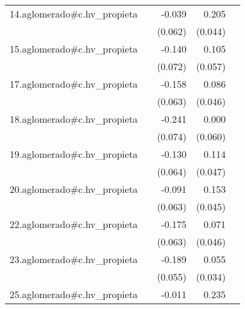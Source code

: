 {\begin{longtable}{l*{4}{D{.}{.}{-1}}}
\addlinespace
14.aglomerado#c.hv\_propieta&                     &      -0.039         &       0.205\sym{***}&                     \\
            &                     &     (0.062)         &     (0.044)         &                     \\
\addlinespace
15.aglomerado#c.hv\_propieta&                     &      -0.140         &       0.105         &                     \\
            &                     &     (0.072)         &     (0.057)         &                     \\
\addlinespace
17.aglomerado#c.hv\_propieta&                     &      -0.158\sym{*}  &       0.086         &                     \\
            &                     &     (0.063)         &     (0.046)         &                     \\
\addlinespace
18.aglomerado#c.hv\_propieta&                     &      -0.241\sym{**} &       0.000         &                     \\
            &                     &     (0.074)         &     (0.060)         &                     \\
\addlinespace
19.aglomerado#c.hv\_propieta&                     &      -0.130\sym{*}  &       0.114\sym{*}  &                     \\
            &                     &     (0.064)         &     (0.047)         &                     \\
\addlinespace
20.aglomerado#c.hv\_propieta&                     &      -0.091         &       0.153\sym{***}&                     \\
            &                     &     (0.063)         &     (0.045)         &                     \\
\addlinespace
22.aglomerado#c.hv\_propieta&                     &      -0.175\sym{**} &       0.071         &                     \\
            &                     &     (0.063)         &     (0.046)         &                     \\
\addlinespace
23.aglomerado#c.hv\_propieta&                     &      -0.189\sym{***}&       0.055         &                     \\
            &                     &     (0.055)         &     (0.034)         &                     \\
\addlinespace
25.aglomerado#c.hv\_propieta&                     &      -0.011         &       0.235\sym{***}&                     \\

\end{longtable}}
